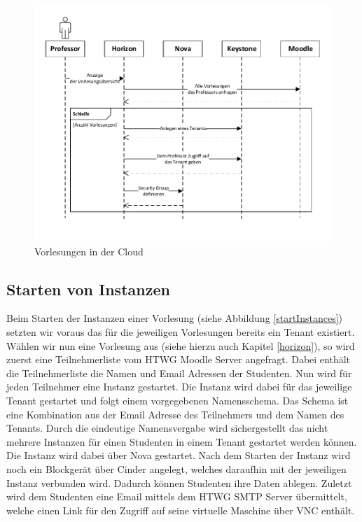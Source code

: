 \begin{figure}[H]
	\centering
	\includegraphics[scale=0.7]{img/createTenants.pdf}
\caption{Vorlesungen in der Cloud}
\label{createTenants}
\FloatBarrier
\end{figure}


\subsection{Starten von Instanzen}
Beim Starten der Instanzen einer Vorlesung 
(siehe Abbildung \ref{startInstances}) setzten wir voraus das für
die jeweiligen Vorlesungen bereits ein Tenant existiert. Wählen wir nun eine Vorlesung aus
(siehe hierzu auch Kapitel \ref{horizon}), so wird zuerst eine Teilnehmerliste vom HTWG Moodle Server
angefragt. Dabei enthält die Teilnehmerliste die Namen und Email Adressen der Studenten.
Nun wird für jeden Teilnehmer eine Instanz gestartet. Die Instanz wird dabei für das jeweilige
Tenant gestartet und folgt einem vorgegebenen Namensschema. Das Schema ist eine Kombination
aus der Email Adresse des Teilnehmers und dem Namen des Tenants. Durch die eindeutige Namensvergabe
wird sichergestellt das nicht mehrere Instanzen für einen Studenten in einem Tenant gestartet
werden können.
Die Instanz wird dabei über Nova gestartet. Nach dem Starten der Instanz wird noch ein Blockgerät
über Cinder angelegt, welches daraufhin mit der jeweiligen Instanz verbunden wird. Dadurch können
Studenten ihre Daten ablegen.
Zuletzt wird dem Studenten eine Email mittels dem HTWG SMTP Server übermittelt, welche einen
Link für den Zugriff auf seine virtuelle Maschine über VNC enthält.

